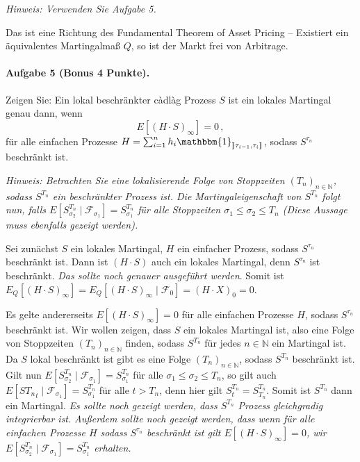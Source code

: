 \documentclass{article}
\begin{document}
\noindent\emph{Hinweis: Verwenden Sie Aufgabe 5.}

Das ist eine Richtung des Fundamental Theorem of Asset Pricing -- Existiert ein äquivalentes Martingalmaß $Q$, so ist der Markt frei von Arbitrage.

\paragraph{Aufgabe 5 \textnormal{(Bonus 4 Punkte)}.}
Zeigen Sie: Ein lokal beschränkter càdlàg Prozess $S$ ist ein lokales Martingal genau dann, wenn
\[
  E[(H\cdot S)_\infty]=0\,,
\]
für alle einfachen Prozesse $H=\sum_{i=1}^nh_i\mathbbm{1}_{\rrbracket \tau_{i-1},\tau_i\rrbracket}$, sodass $S^{\tau_n}$ beschränkt ist.

\noindent\emph{Hinweis: Betrachten Sie eine lokalisierende Folge von Stoppzeiten $(T_n)_{n\in\mathbb{N}}$, sodass $S^{T_n}$ ein beschränkter Prozess ist.
Die Martingaleigenschaft von $S^{T_n}$ folgt nun, falls $E[S_{\sigma_2}^{T_n}\mid \mathscr{F}_{\sigma_1}]=S_{\sigma_1}^{T_n}$ für alle Stoppzeiten $\sigma_1\leq\sigma_2\leq T_n$ (Diese Aussage muss ebenfalls gezeigt werden).}

Sei zunächst $S$ ein lokales Martingal, $H$ ein einfacher Prozess, sodass $S^{\tau_n}$ beschränkt ist.
Dann ist $(H\cdot S)$ auch ein lokales Martingal, denn $S^{\tau_n}$ ist beschränkt. \emph{Das sollte noch genauer ausgeführt werden}.
Somit ist $E_Q[(H\cdot S)_\infty]=E_Q[(H\cdot S)_\infty\mid \mathscr{F}_0]=(H\cdot X)_0=0$.

Es gelte andererseits $E[(H\cdot S)_\infty]=0$ für alle einfachen Prozesse $H$, sodass $S^{\tau_n}$ beschränkt ist.
Wir wollen zeigen, dass $S$ ein lokales Martingal ist, also eine Folge von Stoppzeiten $(T_n)_{n\in\mathbb{N}}$ finden, sodass $S^{T_n}$ für jedes $n\in\mathbb{N}$ ein Martingal ist.
Da $S$ lokal beschränkt ist gibt es eine Folge $(T_n)_{n\in\mathbb{N}}$, sodass $S^{T_n}$ beschränkt ist.
Gilt nun $E[S_{\sigma_2}^{T_n}\mid \mathscr{F}_{\sigma_1}]=S^{T_n}_{\sigma_1}$ für alle $\sigma_1\leq\sigma_2\leq T_n$, so gilt auch $E[S{T_n}_t\mid\mathscr{F}_{\sigma_1}]=S^{T_n}_{\sigma_1}$ für alle $t>T_n$, denn hier gilt $S^{T_n}_t=S^{T_n}_{T_n}$.
Somit ist $S^{T_n}$ dann ein Martingal.
\emph{Es sollte noch gezeigt werden, dass $S^{T_n}$ Prozess gleichgradig integrierbar ist.}
\emph{Außerdem sollte noch gezeigt werden, dass wenn für alle einfachen Prozesse $H$ sodass $S^{\tau_n}$ beschränkt ist gilt $E[(H\cdot S)_\infty]=0$, wir $E[S^{T_n}_{\sigma_2}\mid\mathscr{F}_{\sigma_1}]=S^{T_n}_{\sigma_1}$ erhalten.}
\end{document}
